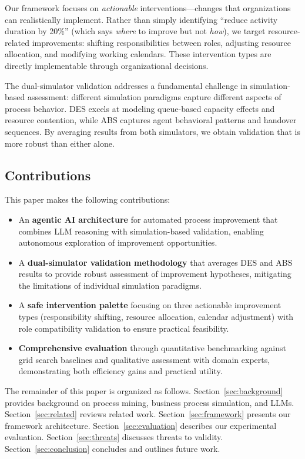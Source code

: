 \documentclass[preprint,12pt]{elsarticle}
\begin{document}
Our framework focuses on \textit{actionable} interventions---changes that organizations can realistically implement. Rather than simply identifying ``reduce activity duration by 20\%'' (which says \textit{where} to improve but not \textit{how}), we target resource-related improvements: shifting responsibilities between roles, adjusting resource allocation, and modifying working calendars. These intervention types are directly implementable through organizational decisions.

The dual-simulator validation addresses a fundamental challenge in simulation-based assessment: different simulation paradigms capture different aspects of process behavior. DES excels at modeling queue-based capacity effects and resource contention, while ABS captures agent behavioral patterns and handover sequences. By averaging results from both simulators, we obtain validation that is more robust than either alone.

\subsection{Contributions}

This paper makes the following contributions:

\begin{itemize}
    \item An \textbf{agentic AI architecture} for automated process improvement that combines LLM reasoning with simulation-based validation, enabling autonomous exploration of improvement opportunities.

    \item A \textbf{dual-simulator validation methodology} that averages DES and ABS results to provide robust assessment of improvement hypotheses, mitigating the limitations of individual simulation paradigms.

    \item A \textbf{safe intervention palette} focusing on three actionable improvement types (responsibility shifting, resource allocation, calendar adjustment) with role compatibility validation to ensure practical feasibility.

    \item \textbf{Comprehensive evaluation} through quantitative benchmarking against grid search baselines and qualitative assessment with domain experts, demonstrating both efficiency gains and practical utility.
\end{itemize}

The remainder of this paper is organized as follows. Section~\ref{sec:background} provides background on process mining, business process simulation, and LLMs. Section~\ref{sec:related} reviews related work. Section~\ref{sec:framework} presents our framework architecture. Section~\ref{sec:evaluation} describes our experimental evaluation. Section~\ref{sec:threats} discusses threats to validity. Section~\ref{sec:conclusion} concludes and outlines future work.
\end{document}
